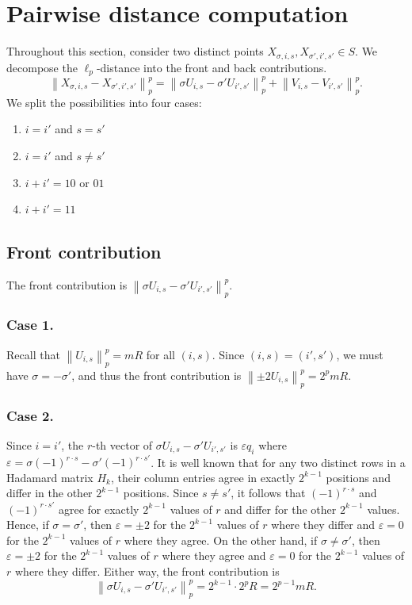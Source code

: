 \documentclass[11pt,reqno]{amsart}
\theoremstyle{plain}
\theoremstyle{definition}
\theoremstyle{remark}
\newcommand{\norm}[1]{\left\lVert #1 \right\rVert}
\numberwithin{equation}{section}
\begin{document}
\section{Pairwise distance computation}\label{sec:distances}
Throughout this section, consider two distinct points $X_{\sigma,i,s},X_{\sigma',i',s'}\in S$. We decompose the $\ell_p$-distance into the front and back contributions.
\[\norm{X_{\sigma,i,s}-X_{\sigma',i',s'}}_p^p=\norm{\sigma U_{i,s}-\sigma'U_{i',s'}}_p^p+\norm{V_{i,s}-V_{i',s'}}_p^p.\]
We split the possibilities into four cases:
\begin{enumerate}
\item $i=i'$ and $s=s'$
\item $i=i'$ and $s\neq s'$
\item $i+i'=10\text{ or }01$
\item $i+i'=11$
\end{enumerate}

\subsection{Front contribution}
The front contribution is $\norm{\sigma U_{i,s}-\sigma' U_{i',s'}}_p^p$.

\subsubsection*{Case 1.}
Recall that $\norm{U_{i,s}}_p^p=mR$ for all $(i,s)$. Since $(i,s)=(i',s')$, we must have $\sigma=-\sigma'$, and thus the front contribution is $\norm{\pm 2U_{i,s}}_p^p=2^pmR$.

\subsubsection*{Case 2.}
Since $i=i'$, the $r$-th vector of $\sigma U_{i,s}-\sigma'U_{i',s'}$ is $\varepsilon q_i$ where $\varepsilon=\sigma (-1)^{r\cdot s}-\sigma'(-1)^{r\cdot s'}$. It is well known that for any two distinct rows in a Hadamard matrix $H_k$, their column entries agree in exactly $2^{k-1}$ positions and differ in the other $2^{k-1}$ positions. Since $s\neq s'$, it follows that $(-1)^{r\cdot s}$ and $(-1)^{r\cdot s'}$ agree for exactly $2^{k-1}$ values of $r$ and differ for the other $2^{k-1}$ values. Hence, if $\sigma=\sigma'$, then $\varepsilon=\pm 2$ for the $2^{k-1}$ values of $r$ where they differ and $\varepsilon=0$ for the $2^{k-1}$ values of $r$ where they agree. On the other hand, if $\sigma\neq\sigma'$, then $\varepsilon=\pm 2$ for the $2^{k-1}$ values of $r$ where they agree and $\varepsilon=0$ for the $2^{k-1}$ values of $r$ where they differ. Either way, the front contribution is
\[\norm{\sigma U_{i,s}-\sigma' U_{i',s'}}_p^p= 2^{k-1}\cdot 2^pR=2^{p-1}mR.\]
\end{document}

